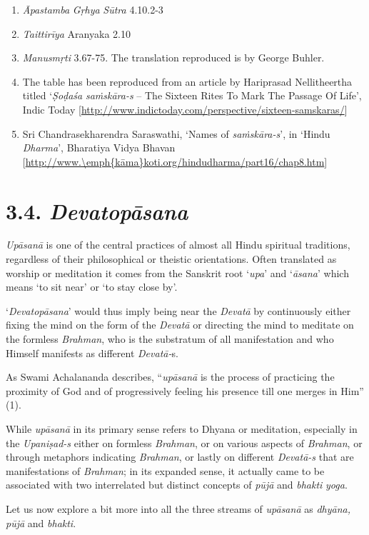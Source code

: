 \begin{enumerate}
\item
  \emph{Āpastamba} \emph{Gṛhya} \emph{Sūtra} 4.10.2-3
\item
  \emph{Taittirīya} Aranyaka 2.10
\item
  \emph{Manusmṛti} 3.67-75. The translation reproduced is by George Buhler.
\item
  The table has been reproduced from an article by Hariprasad Nellitheertha titled `\emph{Ṣoḍaśa} \emph{saṁskāra-s} -- The Sixteen Rites To Mark The Passage Of Life', Indic Today {[}\url{http://www.indictoday.com/perspective/sixteen-samskaras/}{]}
\item
  Sri Chandrasekharendra Saraswathi, `Names of \emph{saṁskāra-s}', in `Hindu \emph{Dharma}', Bharatiya Vidya Bhavan {[}\url{http://www.\emph{kāma}koti.org/hindudharma/part16/chap8.htm}{]}
\end{enumerate}

\section*{3.4. \emph{Devatopāsana}}

\emph{Upāsanā} is one of the central practices of almost all Hindu spiritual traditions, regardless of their philosophical or theistic orientations. Often translated as worship or meditation it comes from the Sanskrit root `\emph{upa}' and `\emph{āsana}' which means `to sit near' or `to stay close by'.

`\emph{Devatopāsana}' would thus imply being near the \emph{Devatā} by continuously either fixing the mind on the form of the \emph{Devatā} or directing the mind to meditate on the formless \emph{Brahman}, who is the substratum of all manifestation and who Himself manifests as different \emph{Devatā-}s.

As Swami Achalananda describes, ``\emph{upāsanā} is the process of practicing the proximity of God and of progressively feeling his presence till one merges in Him'' (1).

While \emph{upāsanā} in its primary sense refers to Dhyana or meditation, especially in the \emph{Upaniṣad-s} either on formless \emph{Brahman}, or on various aspects of \emph{Brahman}, or through metaphors indicating \emph{Brahman}, or lastly on different \emph{Devatā-s} that are manifestations of \emph{Brahman}; in its expanded sense, it actually came to be associated with two interrelated but distinct concepts of \emph{pūjā} and \emph{bhakti} \emph{yoga}.

Let us now explore a bit more into all the three streams of \emph{upāsanā} as \emph{dhyāna, pūjā} and \emph{bhakti}.

